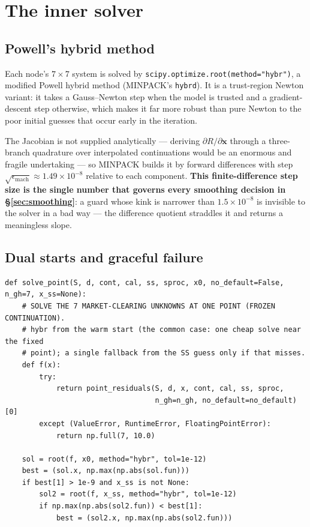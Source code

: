 \documentclass[11pt]{article}
\numberwithin{equation}{section}
\newcommand{\code}[1]{\texttt{\small #1}}
\newcommand{\bx}{\mathbf{x}}
\theoremstyle{definition}
\theoremstyle{plain}
\theoremstyle{remark}
\begin{document}
\section{The inner solver}
\label{sec:newton}

\subsection{Powell's hybrid method}

Each node's $7\times7$ system is solved by \code{scipy.optimize.root(method="hybr")},
a modified Powell hybrid method (MINPACK's \code{hybrd}). It is a trust-region
Newton variant: it takes a Gauss--Newton step when the model is trusted and a
gradient-descent step otherwise, which makes it far more robust than pure Newton to
the poor initial guesses that occur early in the iteration.

The Jacobian is not supplied analytically --- deriving $\partial R/\partial\bx$
through a three-branch quadrature over interpolated continuations would be an
enormous and fragile undertaking --- so MINPACK builds it by forward differences with
step $\sqrt{\epsilon_{\text{mach}}}\approx1.49\times10^{-8}$ relative to each
component. \textbf{This finite-difference step size is the single number that governs
every smoothing decision in \S\ref{sec:smoothing}}: a guard whose kink is narrower
than $1.5\times10^{-8}$ is invisible to the solver in a bad way --- the difference
quotient straddles it and returns a meaningless slope.

\subsection{Dual starts and graceful failure}

\begin{lstlisting}[caption={The point solve. \code{recursive\_main.py}, \code{solve\_point}.}]
def solve_point(S, d, cont, cal, ss, sproc, x0, no_default=False, n_gh=7, x_ss=None):
    # SOLVE THE 7 MARKET-CLEARING UNKNOWNS AT ONE POINT (FROZEN CONTINUATION).
    # hybr from the warm start (the common case: one cheap solve near the fixed
    # point); a single fallback from the SS guess only if that misses.
    def f(x):
        try:
            return point_residuals(S, d, x, cont, cal, ss, sproc,
                                   n_gh=n_gh, no_default=no_default)[0]
        except (ValueError, RuntimeError, FloatingPointError):
            return np.full(7, 10.0)

    sol = root(f, x0, method="hybr", tol=1e-12)
    best = (sol.x, np.max(np.abs(sol.fun)))
    if best[1] > 1e-9 and x_ss is not None:
        sol2 = root(f, x_ss, method="hybr", tol=1e-12)
        if np.max(np.abs(sol2.fun)) < best[1]:
            best = (sol2.x, np.max(np.abs(sol2.fun)))
\end{lstlisting}
\end{document}
